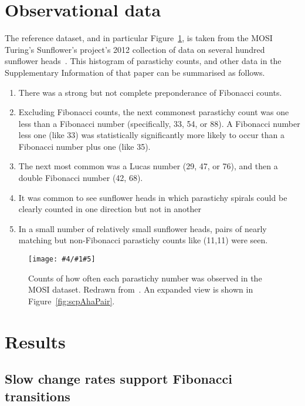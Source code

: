 \documentclass[a4paper,10pt]{amsart}
\newlength{\jfigwidth}
\newcommand{\pdffig}[3]{\jdofig{#1}{#2}{#3}{Figures}{.pdf}}
\newcommand{\jdofig}[5]{
	\begin{figure}\centering\texttt{[image: \#4/\#1\#5]} \caption{#2}\label{fig:#1}\end{figure}
}
\begin{document}
\section{Observational data}
The reference dataset, and in particular Figure~\ref{fig:scpMOSIHistogram},  is taken from the MOSI Turing's Sunflower's project's 2012 collection of data on several hundred sunflower heads~\cite{swintonNovelFibonacciNonFibonacci2016}.    This histogram of parastichy counts, and other data in the Supplementary Information of that paper can be summarised as follows.
\begin{enumerate}
	\item There was a strong but not complete preponderance of Fibonacci counts.
	\item	Excluding Fibonacci counts, the next commonest parastichy count was one less than a Fibonacci number (specifically, 33, 54, or 88).  A Fibonacci number less one (like 33) was statistically significantly more likely to occur than a Fibonacci number plus one (like 35).
	\item The next most common was a Lucas number (29, 47, or 76), and then a double Fibonacci number (42, 68).
	\item It was common to see sunflower heads in which parastichy spirals could be clearly counted in one direction but not in another
	\item In a small number of relatively small sunflower heads, pairs of nearly matching but non-Fibonacci parastichy counts like (11,11)  were seen.
\end{enumerate}

\pdffig{scpMOSIHistogram}{Counts of how often each parastichy number  was observed in the MOSI dataset. Redrawn from~\cite{swintonNovelFibonacciNonFibonacci2016}. An expanded view is shown in Figure~\ref{fig:scpAhaPair}.}{1}
\clearpage
\section{Results}

 


\subsection{Slow change rates support Fibonacci transitions}
	
\end{document}
